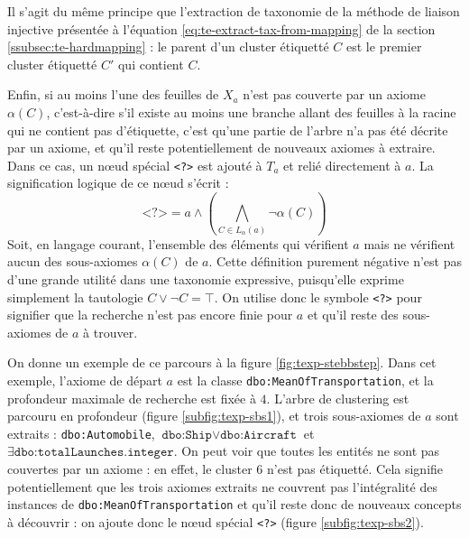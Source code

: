Il s'agit du même principe que l'extraction de taxonomie de la méthode de liaison injective présentée à l'équation \ref{eq:te-extract-tax-from-mapping} de la section \ref{ssubsec:te-hardmapping} : le parent d'un cluster étiquetté $C$ est le premier cluster étiquetté $C'$ qui contient $C$.


Enfin, si au moins l'une des feuilles de $X_a$ n'est pas couverte par un axiome $\alpha(C)$, c'est-à-dire s'il existe au moins une branche allant des feuilles à la racine qui ne contient pas d'étiquette, c'est qu'une partie de l'arbre n'a pas été décrite par un axiome, et qu'il reste potentiellement de nouveaux axiomes à extraire. Dans ce cas, un nœud spécial \texttt{<?>} est ajouté à $T_a$ et relié directement à $a$. La signification logique de ce nœud s'écrit :
\begin{equation}
    \texttt{<?>} = a \land \left( \bigwedge\limits_{C \in L_\alpha(a)} \neg \alpha(C) \right)
    \label{eq:texp-special-node}
\end{equation}
Soit, en langage courant, l'ensemble des éléments qui vérifient $a$ mais ne vérifient aucun des sous-axiomes $\alpha(C)$ de $a$. Cette définition purement négative n'est pas d'une grande utilité dans une taxonomie expressive, puisqu'elle exprime simplement la tautologie $C \lor \neg C = \top$. On utilise donc le symbole \texttt{<?>} pour signifier que la recherche n'est pas encore finie pour $a$ et qu'il reste des sous-axiomes de $a$ à trouver.

On donne un exemple de ce parcours à la figure \ref{fig:texp-stebbstep}. Dans cet exemple, l'axiome de départ $a$ est la classe \texttt{dbo:MeanOfTransportation}, et la profondeur maximale de recherche est fixée à $4$. L'arbre de clustering est parcouru en profondeur (figure \ref{subfig:texp-sbs1}), et trois sous-axiomes de $a$ sont extraits : \texttt{dbo:Automobile}, $\texttt{dbo:Ship} \lor \texttt{dbo:Aircraft}$ et $\exists \texttt{dbo:totalLaunches} . \texttt{integer}$. On peut voir que toutes les entités ne sont pas couvertes par un axiome : en effet, le cluster 6 n'est pas étiquetté. Cela signifie potentiellement que les trois axiomes extraits ne couvrent pas l'intégralité des instances de \texttt{dbo:MeanOfTransportation} et qu'il reste donc de nouveaux concepts à découvrir : on ajoute donc le nœud spécial \texttt{<?>} (figure \ref{subfig:texp-sbs2}).

